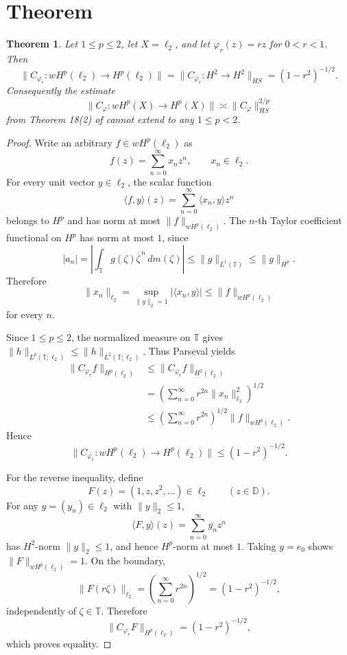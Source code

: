 \documentclass[11pt]{article}
\newtheorem{theorem}{Theorem}
\newcommand{\D}{\mathbb D}
\newcommand{\T}{\mathbb T}
\begin{document}
\section*{Theorem}

\begin{theorem}
Let \(1\leq p\leq2\), let \(X=\ell_2\), and let
\(\varphi_r(z)=rz\) for \(0<r<1\).  Then
\[
 \|C_{\varphi_r}:wH^p(\ell_2)\to H^p(\ell_2)\|
 =
 \|C_{\varphi_r}:H^2\to H^2\|_{HS}
 =
 (1-r^2)^{-1/2}.
\]
Consequently the estimate
\[
 \|C_\varphi:wH^p(X)\to H^p(X)\|
 \asymp
 \|C_\varphi\|_{HS}^{2/p}
\]
from Theorem 18(2) of \cite{LT2015} cannot extend to any \(1\leq p<2\).
\end{theorem}

\begin{proof}
Write an arbitrary \(f\in wH^p(\ell_2)\) as
\[
 f(z)=\sum_{n=0}^{\infty} x_n z^n,\qquad x_n\in\ell_2.
\]
For every unit vector \(y\in\ell_2\), the scalar function
\[
 \langle f,y\rangle(z)=\sum_{n=0}^{\infty}\langle x_n,y\rangle z^n
\]
belongs to \(H^p\) and has norm at most \(\|f\|_{wH^p(\ell_2)}\).  The \(n\)-th
Taylor coefficient functional on \(H^p\) has norm at most \(1\), since
\[
 |a_n|
 =\left|\int_{\T} g(\zeta)\overline{\zeta}^{\,n}\,dm(\zeta)\right|
 \leq \|g\|_{L^1(\T)}
 \leq \|g\|_{H^p}.
\]
Therefore
\[
 \|x_n\|_{\ell_2}
 =
 \sup_{\|y\|_2=1}|\langle x_n,y\rangle|
 \leq \|f\|_{wH^p(\ell_2)}
\]
for every \(n\).

Since \(1\leq p\leq2\), the normalized measure on \(\T\) gives
\(\|h\|_{L^p(\T;\ell_2)}\leq\|h\|_{L^2(\T;\ell_2)}\).  Thus Parseval yields
\[
\begin{aligned}
 \|C_{\varphi_r}f\|_{H^p(\ell_2)}
 &\leq
 \|C_{\varphi_r}f\|_{H^2(\ell_2)}  \\
 &=
 \left(\sum_{n=0}^{\infty} r^{2n}\|x_n\|_{\ell_2}^2\right)^{1/2}  \\
 &\leq
 \left(\sum_{n=0}^{\infty} r^{2n}\right)^{1/2}
 \|f\|_{wH^p(\ell_2)}.
\end{aligned}
\]
Hence
\[
 \|C_{\varphi_r}:wH^p(\ell_2)\to H^p(\ell_2)\|
 \leq
 (1-r^2)^{-1/2}.
\]

For the reverse inequality, define
\[
 F(z)=(1,z,z^2,\ldots)\in\ell_2\qquad (z\in\D).
\]
For any \(y=(y_n)\in\ell_2\) with \(\|y\|_2\leq1\),
\[
 \langle F,y\rangle(z)=\sum_{n=0}^{\infty}\overline{y_n}z^n
\]
has \(H^2\)-norm \(\|y\|_2\leq1\), and hence \(H^p\)-norm at most \(1\).
Taking \(y=e_0\) shows \(\|F\|_{wH^p(\ell_2)}=1\).  On the boundary,
\[
 \|F(r\zeta)\|_{\ell_2}
 =
 \left(\sum_{n=0}^{\infty}r^{2n}\right)^{1/2}
 =
 (1-r^2)^{-1/2},
\]
independently of \(\zeta\in\T\).  Therefore
\[
 \|C_{\varphi_r}F\|_{H^p(\ell_2)}
 =
 (1-r^2)^{-1/2},
\]
which proves equality.


\end{proof}
\end{document}
